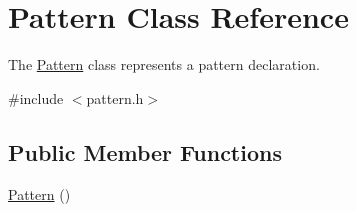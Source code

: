\hypertarget{class_pattern}{}\section{Pattern Class Reference}
\label{class_pattern}


The \hyperlink{class_pattern}{Pattern} class represents a pattern declaration.  




{\ttfamily \#include $<$pattern.\+h$>$}

\subsection*{Public Member Functions}
\begin{DoxyCompactItemize}
\item 
\hyperlink{class_pattern_a95f42b0f1717d9e6c2d831e87d27f83c}{Pattern} ()\hypertarget{class_pattern_a95f42b0f1717d9e6c2d831e87d27f83c}{}\label{class_pattern_a95f42b0f1717d9e6c2d831e87d27f83c}


\end{DoxyCompactItemize}
